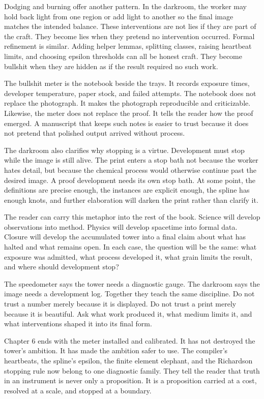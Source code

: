 Dodging and burning offer another pattern. In the darkroom, the worker may
hold back light from one region or add light to another so the final image
matches the intended balance. These interventions are not lies if they are
part of the craft. They become lies when they pretend no intervention occurred.
Formal refinement is similar. Adding helper lemmas, splitting classes, raising
heartbeat limits, and choosing epsilon thresholds can all be honest craft. They
become bullshit when they are hidden as if the result required no such work.

The bullshit meter is the notebook beside the trays. It records exposure times,
developer temperature, paper stock, and failed attempts. The notebook does not
replace the photograph. It makes the photograph reproducible and criticizable.
Likewise, the meter does not replace the proof. It tells the reader how the
proof emerged. A manuscript that keeps such notes is easier to trust because it
does not pretend that polished output arrived without process.

The darkroom also clarifies why stopping is a virtue. Development must stop
while the image is still alive. The print enters a stop bath not because the
worker hates detail, but because the chemical process would otherwise continue
past the desired image. A proof development needs its own stop bath. At some
point, the definitions are precise enough, the instances are explicit enough,
the spline has enough knots, and further elaboration will darken the print
rather than clarify it.

The reader can carry this metaphor into the rest of the book. Science will
develop observations into method. Physics will develop spacetime into formal
data. Closure will develop the accumulated tower into a final claim about what
has halted and what remains open. In each case, the question will be the same:
what exposure was admitted, what process developed it, what grain limits the
result, and where should development stop?

The speedometer says the tower needs a diagnostic gauge. The darkroom says the
image needs a development log. Together they teach the same discipline. Do not
trust a number merely because it is displayed. Do not trust a print merely
because it is beautiful. Ask what work produced it, what medium limits it, and
what interventions shaped it into its final form.

Chapter 6 ends with the meter installed and calibrated. It has not destroyed
the tower's ambition. It has made the ambition safer to use. The compiler's
heartbeats, the spline's epsilon, the finite element elephant, and the
Richardson stopping rule now belong to one diagnostic family. They tell the
reader that truth in an instrument is never only a proposition. It is a
proposition carried at a cost, resolved at a scale, and stopped at a boundary.

